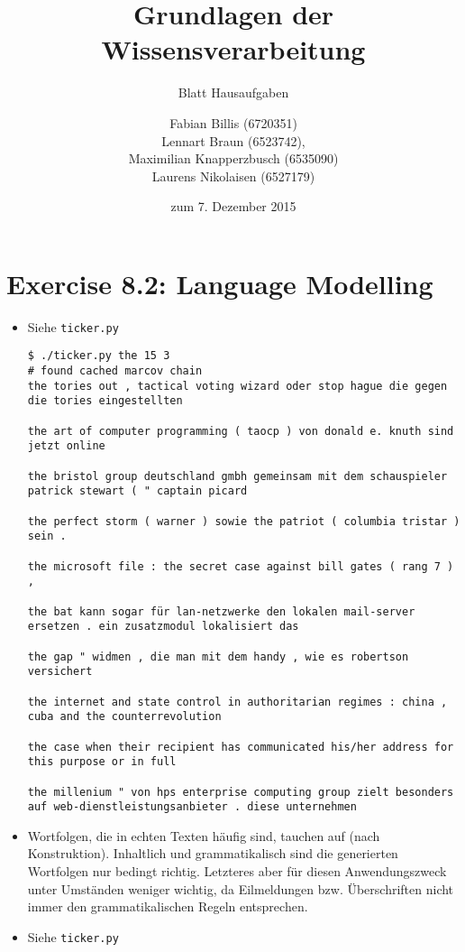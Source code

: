 \documentclass[a4paper]{scrartcl}
\title{Grundlagen der Wissensverarbeitung}
\subtitle{Blatt {\blattnr} Hausaufgaben}
\author{
    Fabian Billis (6720351) \\
    Lennart Braun (6523742), \\
    Maximilian Knapperzbusch (6535090) \\
    Laurens Nikolaisen (6527179) \\
}
\date{zum 7. Dezember 2015}
\def \blattnr {8}
\begin{document}
\maketitle

\section*{Exercise \blattnr.2: Language Modelling}

\begin{itemize}
    \item Siehe \texttt{ticker.py}
        \begin{tiny}
\begin{verbatim}
$ ./ticker.py the 15 3
# found cached marcov chain
the tories out , tactical voting wizard oder stop hague die gegen die tories eingestellten

the art of computer programming ( taocp ) von donald e. knuth sind jetzt online

the bristol group deutschland gmbh gemeinsam mit dem schauspieler patrick stewart ( " captain picard

the perfect storm ( warner ) sowie the patriot ( columbia tristar ) sein .

the microsoft file : the secret case against bill gates ( rang 7 ) ,

the bat kann sogar für lan-netzwerke den lokalen mail-server ersetzen . ein zusatzmodul lokalisiert das

the gap " widmen , die man mit dem handy , wie es robertson versichert

the internet and state control in authoritarian regimes : china , cuba and the counterrevolution

the case when their recipient has communicated his/her address for this purpose or in full

the millenium " von hps enterprise computing group zielt besonders auf web-dienstleistungsanbieter . diese unternehmen
\end{verbatim}
\end{tiny}
    \item
        Wortfolgen, die in echten Texten häufig sind, tauchen auf (nach Konstruktion).
        Inhaltlich und grammatikalisch sind die generierten Wortfolgen nur bedingt richtig.
        Letzteres aber für diesen Anwendungszweck unter Umständen weniger
        wichtig, da Eilmeldungen bzw.  Überschriften nicht immer den
        grammatikalischen Regeln entsprechen.

    \item Siehe \texttt{ticker.py}
\end{itemize}
\end{document}
